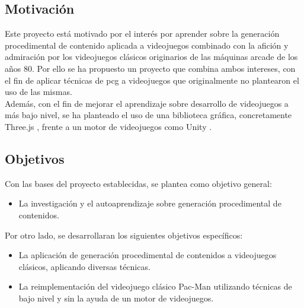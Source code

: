 
\subsection{Motivación}

Este proyecto está motivado por el interés por aprender sobre la generación procedimental de contenido aplicada a videojuegos combinado con la afición y admiración por los videojuegos clásicos originarios de las máquinas arcade de los años 80. Por ello se ha propuesto un proyecto que combina ambos intereses, con el fin de aplicar técnicas de \acrshort{pcg} a videojuegos que originalmente no plantearon el uso de las mismas.\\

Además, con el fin de mejorar el aprendizaje sobre desarrollo de videojuegos a más bajo nivel, se ha planteado el uso de una biblioteca gráfica, concretamente Three.js \cite{three.js}, frente a un motor de videojuegos como Unity \cite{unity}.


\subsection{Objetivos}

Con las bases del proyecto establecidas, se plantea como objetivo general:

\begin{itemize}
    \item La investigación y el autoaprendizaje sobre generación procedimental de contenidos.
\end{itemize}

Por otro lado, se desarrollaran los siguientes objetivos específicos:

\begin{itemize}
    \item La aplicación de generación procedimental de contenidos a videojuegos clásicos, aplicando diversas técnicas.
    \item La reimplementación del videojuego clásico Pac-Man utilizando técnicas de bajo nivel y sin la ayuda de un motor de videojuegos.
\end{itemize}

